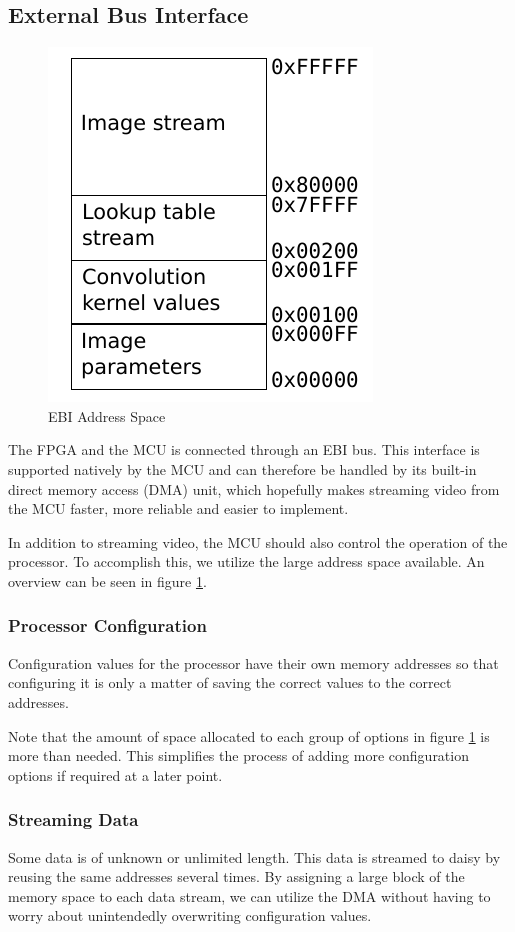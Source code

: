 \subsection{External Bus Interface}
\begin{figure}
    \centering
    \includegraphics[]{img/EbiAddressSpace.pdf}
    \caption{EBI Address Space}
    \label{fig:EbiAddressSpace}
\end{figure}
The FPGA and the MCU is connected through an EBI bus.
This interface is supported natively by the MCU and can therefore be handled by its built-in direct memory access (DMA) unit, which hopefully makes streaming video from the MCU faster, more reliable and easier to implement.

In addition to streaming video, the MCU should also control the operation of the processor.
To accomplish this, we utilize the large address space available.
An overview can be seen in figure \ref{fig:EbiAddressSpace}.

\subsubsection{Processor Configuration}
Configuration values for the processor have their own memory addresses so that configuring it is only a matter of saving the correct values to the correct addresses.

Note that the amount of space allocated to each group of options in figure \ref{fig:EbiAddressSpace} is more than needed.
This simplifies the process of adding more configuration options if required at a later point.

\subsubsection{Streaming Data}
Some data is of unknown or unlimited length. This data is streamed to daisy by reusing the same addresses several times.
By assigning a large block of the memory space to each data stream, we can utilize the DMA without having to worry about unintendedly overwriting configuration values.

